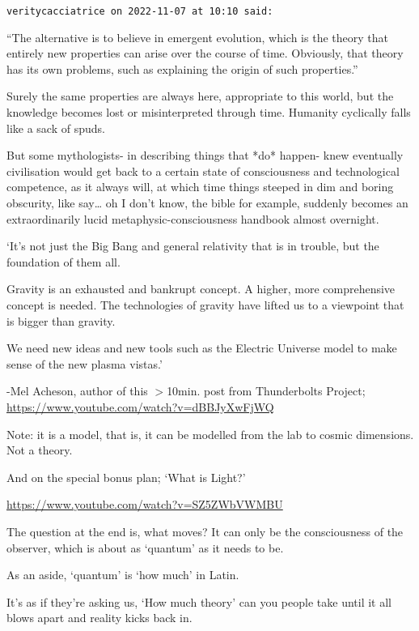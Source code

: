 \begin{footnotesize}\begin{sffamily}

\texttt{veritycacciatrice on 2022-11-07 at 10:10 said: }

“The alternative is to believe in emergent evolution, which is the theory that entirely new properties can arise over the course of time. Obviously, that theory has its own problems, such as explaining the origin of such properties.”

Surely the same properties are always here, appropriate to this world, but the knowledge becomes lost or misinterpreted through time. Humanity cyclically falls like a sack of spuds.

But some mythologists- in describing things that *do* happen- knew eventually civilisation would get back to a certain state of consciousness and technological competence, as it always will, at which time things steeped in dim and boring obscurity, like say… oh I don’t know, the bible for example, suddenly becomes an extraordinarily lucid metaphysic-consciousness handbook almost overnight.

`It’s not just the Big Bang and general relativity that is in trouble, but the foundation of them all.

Gravity is an exhausted and bankrupt concept. A higher, more comprehensive concept is needed. The technologies of gravity have lifted us to a viewpoint that is bigger than gravity.

We need new ideas and new tools such as the Electric Universe model to make sense of the new plasma vistas.’

-Mel Acheson, author of this $>$10min. post from Thunderbolts Project;
\url{https://www.youtube.com/watch?v=dBBJyXwFjWQ}

Note: it is a model, that is, it can be modelled from the lab to cosmic dimensions. Not a theory. 

And on the special bonus plan; `What is Light?’

\url{https://www.youtube.com/watch?v=SZ5ZWbVWMBU}

The question at the end is, what moves? It can only be the consciousness of the observer, which is about as `quantum' as it needs to be.

As an aside, `quantum' is `how much' in Latin.

It’s as if they’re asking us, `How much theory' can you people take until it all blows apart and reality kicks back in.



\end{sffamily}
\end{footnotesize}
